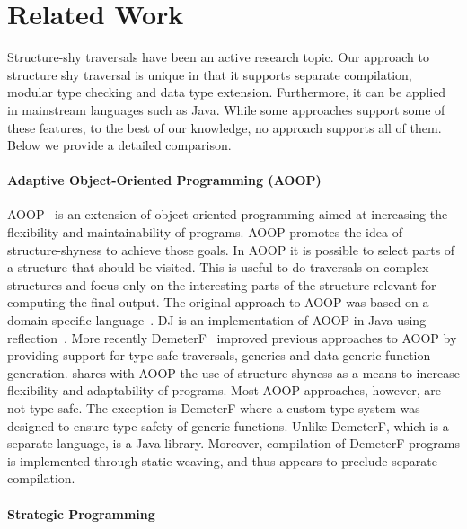 \section{Related Work}\label{sec:related}


Structure-shy traversals have been an active research topic.  Our
approach to structure shy traversal is unique in that it supports
separate compilation, modular type checking and data type
extension. Furthermore, it can be applied in mainstream languages such
as Java. While some approaches support some of these features, to the
best of our knowledge, no approach supports all of them.  Below we
provide a detailed comparison.

\paragraph{Adaptive Object-Oriented Programming (AOOP)}
AOOP~\cite{DemeterBook} is an extension of object-oriented programming
aimed at increasing the flexibility and maintainability of
programs. AOOP promotes the idea of structure-shyness to achieve those
goals. In AOOP it is possible to select parts of a structure that
should be visited. This is useful to do traversals on complex
structures and focus only on the interesting parts of the structure
relevant for computing the final output. The original approach to AOOP
was based on a domain-specific language~\cite{DemeterBook}. DJ is an
implementation of AOOP in Java using reflection~\cite{DJ}. More
recently DemeterF~\cite{OOGP} improved previous approaches to AOOP by
providing support for type-safe traversals, generics and data-generic
function generation. \name shares with AOOP the use of
structure-shyness as a means to increase flexibility and adaptability
of programs.  Most AOOP approaches, however, are not type-safe. The
exception is DemeterF where a custom type system was designed to
ensure type-safety of generic functions. Unlike DemeterF, which is a
separate language, \name is a Java library.  Moreover, compilation of
DemeterF programs is implemented through static weaving, and thus appears to
preclude separate compilation.

\paragraph{Strategic Programming}

